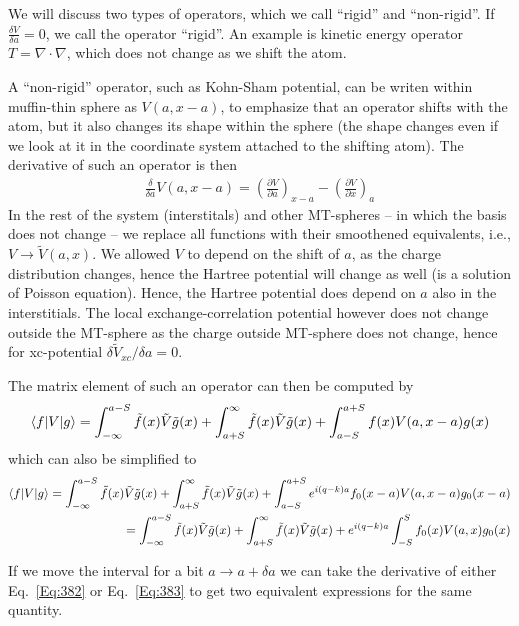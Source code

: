 \documentclass[aps,prb,floatfix,epsfig,singlecolumn,showpacs,preprintnumbers]{revtex4}
\begin{document}
We will discuss two types of operators, which we call ``rigid'' and
``non-rigid''.  If $\frac{\delta V}{\delta a}=0$, we call the operator
``rigid''. An example is kinetic energy operator
$T =\nabla\cdot\nabla$, which does not change as we shift the atom.

A ``non-rigid'' operator, such as Kohn-Sham potential, can be writen
within muffin-thin sphere as $V(a,x-a)$, to emphasize that an operator
shifts with the atom, but it also changes its shape within the sphere
(the shape changes even if we look at it in the coordinate system attached to the shifting
atom).
The derivative of such an operator is then
\begin{eqnarray}
\frac{\delta}{\delta a} V(a,x-a) = 
\left(\frac{\partial V}{\partial  a}\right)_{x-a}
- \left(\frac{\partial V}{\partial  x}\right)_a
\label{Eq:381}
\end{eqnarray}
In the rest of the system (interstitals) and other MT-spheres -- in
which the basis does not change -- we replace all functions with their
smoothened equivalents, i.e., $V\rightarrow \tilde{V}(a,x)$. We
allowed $V$ to depend on the shift of $a$, as the charge distribution
changes, hence the Hartree potential will change as well (is a
solution of Poisson equation). Hence, the Hartree potential does
depend on $a$ also in the interstitials.  The local
exchange-correlation potential however does not change outside the
MT-sphere as the charge outside MT-sphere does not change, hence for
xc-potential $\delta\tilde{V}_{xc}/\delta a=0$.


The matrix element of such an operator can then be computed by
\begin{eqnarray}
\braket{f|V|g} = \int_{-\infty}^{a-S} \tilde{f}(x) \tilde{V} \tilde{g}(x) +
  \int_{a+S}^{\infty}\tilde{f}(x) \tilde{V}\tilde{g}(x) + \int_{a-S}^{a+S}  f(x) V(a,x-a) g(x)
\label{Eq:382}
\end{eqnarray}
which can also be simplified to
\begin{eqnarray}
\braket{f|V|g} = \int_{-\infty}^{a-S} \tilde{f}(x) \tilde{V} \tilde{g}(x) +
  \int_{a+S}^{\infty}\tilde{f}(x) \tilde{V}\tilde{g}(x) + \int_{a-S}^{a+S}
  e^{i (q-k)a} f_0(x-a) V(a,x-a) g_0(x-a)
\nonumber\\
= \int_{-\infty}^{a-S} \tilde{f}(x) \tilde{V} \tilde{g}(x) +
  \int_{a+S}^{\infty}\tilde{f}(x) \tilde{V}\tilde{g}(x) 
+ e^{i (q-k)a} \int_{-S}^{S}  f_0(x) V(a,x) g_0(x)
\label{Eq:383}
\end{eqnarray}

If we move the interval for a bit $a\rightarrow a+\delta a$ we can
take the derivative of either Eq.~\ref{Eq:382} or Eq.~\ref{Eq:383} to
get two equivalent expressions for the same quantity.
\end{document}
